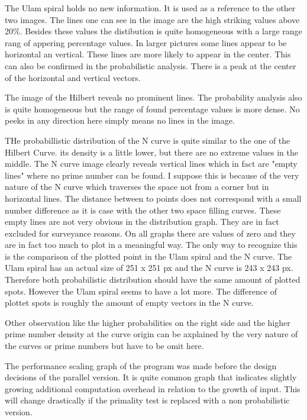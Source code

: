The Ulam spiral holds no new information. It is used as a reference to the other two images. The lines one can see in the image are the high striking values above 20\%. Besides these values the distibution is quite homogeneous with a large range rang of appering percentage values. In larger pictures some lines appear to be horizontal an vertical. These lines are more likely to appear in the center. This can also be confirmed in the probabilistic analysis. There is a peak at the center of the horizontal and vertical vectors.

The image of the Hilbert reveals no prominent lines. The probability analysis also is quite homogeneous but the range of found percentage values is more dense. No peeks in any direction here simply means no lines in the image.

THe probabillistic distribution of the N curve is quite similar to the one of the Hilbert Curve. its density is a little lower, but there are no extreme values in the middle. The N curve image clearly reveals vertical lines which in fact are "empty lines" where no prime number can be found. I suppose this is because of the very nature of the N curve which traverses the space not from a corner but in horizontal lines. The distance between to points does not correspond with a small number difference as it is case with the other two space filling curves.
These empty lines are not very obvious in the distribution graph. They are in fact excluded for surveyance reasons. On all graphs there are values of zero and they are in fact too much to plot in a meaningful way. The only way to recognize this is the comparison of the plotted point in the Ulam spiral and the N curve. The Ulam spiral has an actual size of 251 x 251 px and the N curve is 243 x 243 px. Therefore both probabilistic distribution should have the same amount of plotted spots. However the Ulam spiral seems to have a lot more. The difference of plottet spots is roughly the amount of empty vectors in the N curve.

Other observation like the higher probabilities on the right side and the higher prime number density at the curve origin can be axplained by the very nature of the curves or prime numbers but have to be omit here.

The performance scaling graph of the program was made before the design decisions of the parallel version. It is quite common graph that indicates slightly growing additional computation overhead in relation to the growth of input. This will change drastically if the primality test is replaced with a non probabilistic version.

